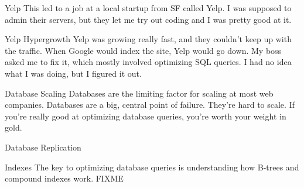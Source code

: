 \documentclass[14pt]{beamer}
\begin{document}
\begin{frame}{Yelp}
  This led to a job at a local startup from SF called Yelp.
  \newline
  \newline
  I was supposed to admin their servers, but they let me try out coding and I
  was pretty good at it.
\end{frame}

\begin{frame}{Yelp Hypergrowth}
  Yelp was growing really fast, and they couldn't keep up with the traffic. When
  Google would index the site, Yelp would go down.
  \newline
  \newline
  My boss asked me to fix it, which mostly involved optimizing SQL queries. I
  had no idea what I was doing, but I figured it out.
\end{frame}

\begin{frame}{Database Scaling}
  Databases are the limiting factor for scaling at most web companies.
  \newline
  \newline
  Databases are a big, central point of failure. They're hard to scale. If
  you're really good at optimizing database queries, you're worth your weight in
  gold.
\end{frame}

\begin{frame}{Database Replication}
\end{frame}

\begin{frame}{Indexes}
  The key to optimizing database queries is understanding how B-trees and
  compound indexes work.
  \newline
  \newline
  FIXME
\end{frame}
\end{document}
